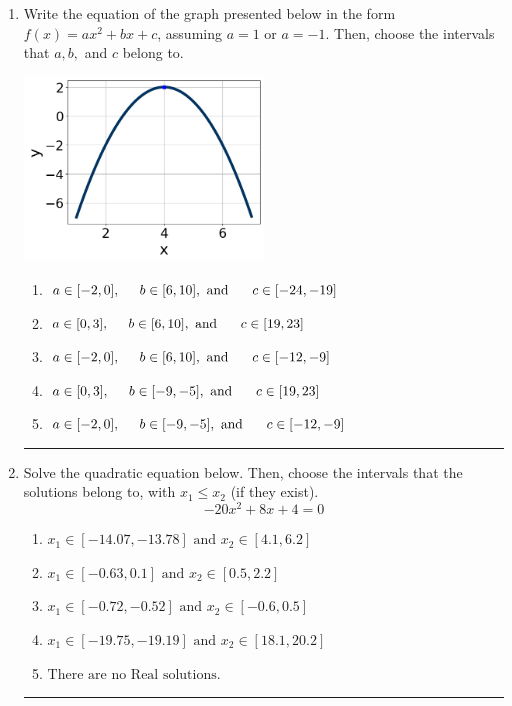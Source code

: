 \documentclass[14pt]{extbook}
\newcommand{\litem}[1]{\item#1\hspace*{-1cm}\rule{\textwidth}{0.4pt}}
\begin{document}
\begin{enumerate}
{\begin{enumerate}[label=\Alph*.]
\end{enumerate} }
\litem{
Write the equation of the graph presented below in the form $f(x)=ax^2+bx+c$, assuming  $a=1$ or $a=-1$. Then, choose the intervals that $a, b,$ and $c$ belong to.
\begin{center}
    \includegraphics[width=0.5\textwidth]{../Figures/quadraticGraphToEquationCopyB.png}
\end{center}
\begin{enumerate}[label=\Alph*.]
\item \( a \in [-2, 0], \hspace*{5mm} b \in [6, 10], \text{ and } \hspace*{5mm} c \in [-24, -19] \)
\item \( a \in [0, 3], \hspace*{5mm} b \in [6, 10], \text{ and } \hspace*{5mm} c \in [19, 23] \)
\item \( a \in [-2, 0], \hspace*{5mm} b \in [6, 10], \text{ and } \hspace*{5mm} c \in [-12, -9] \)
\item \( a \in [0, 3], \hspace*{5mm} b \in [-9, -5], \text{ and } \hspace*{5mm} c \in [19, 23] \)
\item \( a \in [-2, 0], \hspace*{5mm} b \in [-9, -5], \text{ and } \hspace*{5mm} c \in [-12, -9] \)

\end{enumerate} }
\litem{
Solve the quadratic equation below. Then, choose the intervals that the solutions belong to, with $x_1 \leq x_2$ (if they exist).\[ -20x^{2} +8 x + 4 = 0 \]\begin{enumerate}[label=\Alph*.]
\item \( x_1 \in [-14.07, -13.78] \text{ and } x_2 \in [4.1, 6.2] \)
\item \( x_1 \in [-0.63, 0.1] \text{ and } x_2 \in [0.5, 2.2] \)
\item \( x_1 \in [-0.72, -0.52] \text{ and } x_2 \in [-0.6, 0.5] \)
\item \( x_1 \in [-19.75, -19.19] \text{ and } x_2 \in [18.1, 20.2] \)
\item \( \text{There are no Real solutions.} \)


\end{enumerate}}
\end{enumerate}
\end{document}
